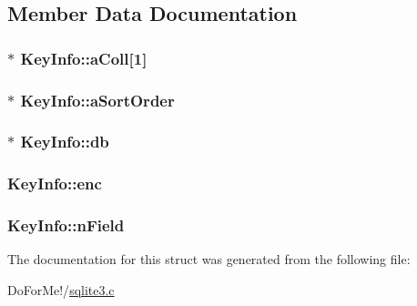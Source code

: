 \subsection{Member Data Documentation}
\hypertarget{struct_key_info_ad43aa024fca5a065e75d8e24b231adcb}{
\subsubsection[{a\-Coll}]{$\ast$ Key\-Info\-::a\-Coll\mbox{[}1\mbox{]}}}\label{struct_key_info_ad43aa024fca5a065e75d8e24b231adcb}
\hypertarget{struct_key_info_ac5fe4bd0172a1f11f41f678528a7b21e}{
\subsubsection[{a\-Sort\-Order}]{$\ast$ Key\-Info\-::a\-Sort\-Order}}\label{struct_key_info_ac5fe4bd0172a1f11f41f678528a7b21e}
\hypertarget{struct_key_info_af2e7a3a411f5ca1ccf6de77d320b59db}{
\subsubsection[{db}]{$\ast$ Key\-Info\-::db}}\label{struct_key_info_af2e7a3a411f5ca1ccf6de77d320b59db}
\hypertarget{struct_key_info_a37972825f9a148668e979be12465e832}{
\subsubsection[{enc}]{ Key\-Info\-::enc}}\label{struct_key_info_a37972825f9a148668e979be12465e832}
\hypertarget{struct_key_info_af70436487a95e445d540bfc4ca1d3f0b}{
\subsubsection[{n\-Field}]{ Key\-Info\-::n\-Field}}\label{struct_key_info_af70436487a95e445d540bfc4ca1d3f0b}


The documentation for this struct was generated from the following file\-:\begin{DoxyCompactItemize}
\item 
Do\-For\-Me!/\hyperlink{sqlite3_8c}{sqlite3.\-c}\end{DoxyCompactItemize}
